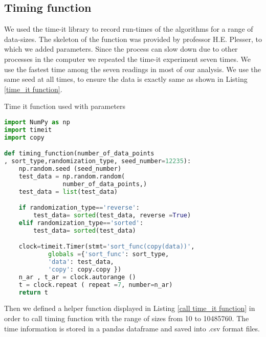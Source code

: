 \documentclass[sigconf, nonacm, natbib, screen, balance=False]{acmart}
\begin{document}
\subsection{Timing function}\label{sec:timing function}

We used the time-it library to record run-times of the algorithms for a range of data-sizes. The skeleton of the function was provided by professor H.E. Plesser, to which we added parameters. Since the process can slow down due to other processes in the computer we repeated the time-it experiment seven times. We use the fastest time among the seven readings in most of our analysis. We use the same seed at all times, to ensure the data is exactly same as shown in Listing \ref{time_it function}.

\begin{listing}
  \caption{Time it function used with parameters}
  \label{time_it function}
\begin{lstlisting}[language=Python]
import NumPy as np
import timeit
import copy

def timing_function(number_of_data_points
, sort_type,randomization_type, seed_number=12235):
    np.random.seed (seed_number)
    test_data = np.random.random(
                number_of_data_points,)
    test_data = list(test_data)

    if randomization_type=='reverse':
        test_data= sorted(test_data, reverse =True)
    elif randomization_type=='sorted':
        test_data= sorted(test_data)

    clock=timeit.Timer(stmt='sort_func(copy(data))',
            globals ={'sort_func': sort_type,
            'data': test_data,
            'copy': copy.copy })
    n_ar , t_ar = clock.autorange ()
    t = clock.repeat ( repeat =7, number=n_ar)
    return t
\end{lstlisting}
\end{listing}

Then we defined a helper function displayed in Listing  \ref{call time_it function} in order to call timing function with the range of sizes from 10 to 10485760. The time information is stored in a pandas dataframe and saved into .csv format files.
\end{document}
